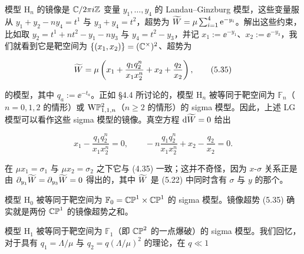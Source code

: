 
模型 $\mathrm{H}_n$ 的镜像是 $\mathbb{C}/2\pi i\mathbb{Z}$ 变量 $y_1,\dots,y_4$ 的 Landau–Ginzburg 模型，这些变量服从 $y_1+y_2-ny_4=t^1$ 与 $y_3+y_4=t^2$，超势为 $\widetilde{W}=\mu\sum_{i=1}^{4}\mathrm{e}^{-y_i}$。解出这些约束，比如取 $y_2=t^1+nt^2-y_1-ny_3$ 与 $y_4=t^2-y_3$，并记 $x_1:=\ee^{-y_1}$、$x_2:=\ee^{-y_3}$，我们就看到它是靶空间为 $\{(x_1,x_2)\}=(\mathbb{C}^\times)^2$、超势为

\begin{equation}
	\widetilde{W} = \mu\left(x_1+\frac{q_1q_2^n}{x_1x_2^n}+x_2+\frac{q_2}{x_2}\right), \tag{5.35}
\end{equation}

的模型，其中 $q_a:=\ee^{-t_a}$。正如 §4.4 所讨论的，模型 $\mathrm{H}_n$ 被等同于靶空间为 $\mathbb{F}_n$（$n=0,1,2$ 的情形）或 $\mathrm{W}\mathbb{P}^2_{1,1,n}$（$n\ge2$ 的情形）的 sigma 模型。因此，上述 LG 模型可以看作这些 sigma 模型的镜像。真空方程 $\mathrm{d}\widetilde{W}=0$ 给出

\begin{equation}
	x_1-\frac{q_1q_2^n}{x_1x_2^n}=0,\qquad -n\frac{q_1q_2^n}{x_1x_2^n}+x_2-\frac{q_2}{x_2}=0. \tag{5.36}
\end{equation}

在 $\mu x_1=\sigma_1$ 与 $\mu x_2=\sigma_2$ 之下它与 (4.35) 一致；这并不奇怪，因为 $x$-$\sigma$ 关系正是由 $\partial_{y_1}\widetilde{W}=\partial_{y_3}\widetilde{W}=0$ 得出的，其中 $\widetilde{W}$ 是 (5.22) 中同时含有 $\sigma$ 与 $y$ 的那个。



模型 $\mathrm{H}_0$ 被等同于靶空间为 $\mathbb{F}_0=\mathbb{CP}^1\times\mathbb{CP}^1$ 的 sigma 模型。镜像超势 (5.35) 确实就是两份 $\mathbb{CP}^1$ 的镜像超势之和。


模型 $\mathrm{H}_1$ 被等同于靶空间为 $\mathbb{F}_1$（即 $\mathbb{CP}^2$ 的一点爆破）的 sigma 模型。我们回忆，对于具有 $q_1=\Lambda/\mu$ 与 $q_2=q(\Lambda/\mu)^2$ 的理论，在 $q\ll1$
